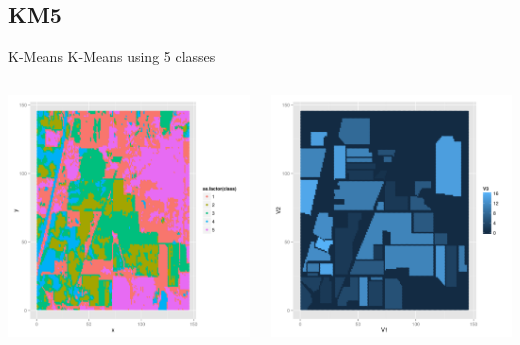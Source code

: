 \documentclass[11pt]{beamer}
\begin{document}
\subsection{KM5}
\begin{frame}{K-Means}
K-Means using 5 classes
\begin{columns}[T]
\begin{column}{.48\textwidth}
\includegraphics[scale=.3]{km5.png}
\end{column}
\hfill
\begin{column}{.48\textwidth}
\includegraphics[scale=.3]{gt.png}
\end{column}
\end{columns}
\end{frame}
\end{document}
